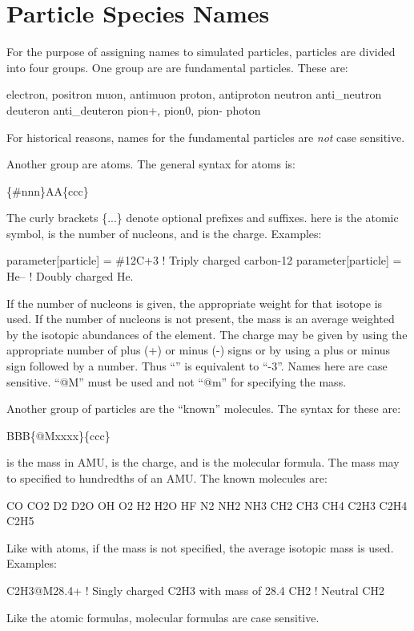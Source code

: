 {{{\section{Particle Species Names}
\label{s:species.name}

For the purpose of assigning names to simulated particles, particles are divided into four
groups. One group are are fundamental particles. These are:
\begin{example}
  electron,  positron
  muon,      antimuon
  proton,    antiproton
  neutron    anti_neutron
  deuteron   anti_deuteron
  pion+,     pion0,      pion-
  photon
\end{example}
For historical reasons, names for the fundamental particles are {\em not} case sensitive.

Another group are atoms. The general syntax for atoms is:
\begin{example}
  \{\#nnn\}AA\{ccc\}
\end{example}
The curly brackets \{...\} denote optional prefixes and suffixes.  here is the
atomic symbol,  is the number of nucleons, and  is the charge. Examples:
\begin{example}
  parameter[particle] = \#12C+3       ! Triply charged carbon-12
  parameter[particle] = He--          ! Doubly charged He.
\end{example}
If the number of nucleons is given, the appropriate weight for that isotope is used. If the number
of nucleons is not present, the mass is an average weighted by the isotopic abundances of the
element. The charge may be given by using the appropriate number of plus (+) or minus (-) signs or
by using a plus or minus sign followed by a number. Thus ``\vn{-{-}-}'' is equivalent to
``-3''. Names here are case sensitive. ``@M'' must be used and not ``@m'' for specifying the mass.

Another group of particles are the ``known'' molecules. The syntax for these are:
\begin{example}
  BBB\{@Mxxxx\}\{ccc\}
\end{example}
 is the mass in AMU,  is the charge, and  is the molecular formula. The
mass may to specified to hundredths of an AMU. The known molecules are:
\begin{example}
  CO       CO2      
  D2       D2O      
  OH       O2      
  H2       H2O      HF
  N2       NH2      NH3      
  CH2      CH3      CH4      
  C2H3     C2H4     C2H5
\end{example}
Like with atoms, if the mass is not specified, the average isotopic mass is used. Examples:
\begin{example}
  C2H3@M28.4+     ! Singly charged C2H3 with mass of 28.4
  CH2             ! Neutral CH2
\end{example}
Like the atomic formulas, molecular formulas are case sensitive.

}}}
